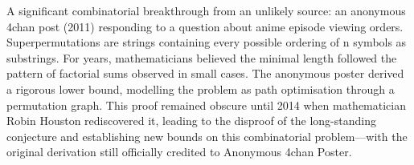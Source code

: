 A significant combinatorial breakthrough from an unlikely source: an anonymous 4chan post (2011) responding to a question about anime episode viewing orders. Superpermutations are strings containing every possible ordering of n symbols as substrings. For years, mathematicians believed the minimal length followed the pattern of factorial sums observed in small cases. The anonymous poster derived a rigorous lower bound, modelling the problem as path optimisation through a permutation graph. This proof remained obscure until 2014 when mathematician Robin Houston rediscovered it, leading to the disproof of the long-standing conjecture and establishing new bounds on this combinatorial problem—with the original derivation still officially credited to \QSOpen{}Anonymous 4chan Poster.\QSClose{}
